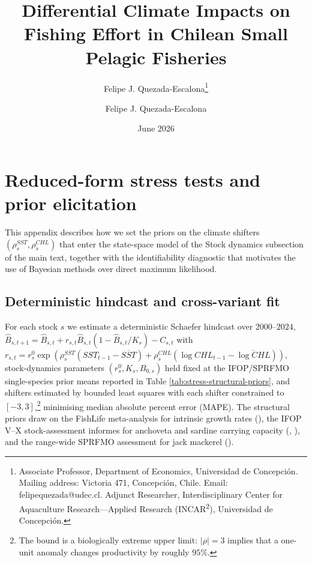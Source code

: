 \documentclass[
  11pt,
]{article}
\author{Felipe J. Quezada-Escalona\thanks{Associate Professor, Department of Economics, Universidad de Concepci\'on. Mailing address: Victoria 471, Concepci\'on, Chile. Email: felipequezada@udec.cl. Adjunct Researcher, Interdisciplinary Center for Aquaculture Research---Applied Research (INCAR\textsuperscript{2}), Universidad de Concepci\'on.}}
\affil{Universidad de Concepci\'on \vspace{-60pt}}
\title{Differential Climate Impacts on Fishing Effort in Chilean Small Pelagic Fisheries}
\subtitle{\begin{center}{\Large\textbf{Online Appendix}}\end{center}}
\author{Felipe J. Quezada-Escalona}
\date{June 2026}
\begin{document}
\maketitle

\doublespacing

\section{Reduced-form stress tests and prior elicitation}\label{appendix-stress}

This appendix describes how we set the priors on the climate shifters
\((\rho_s^{SST}, \rho_s^{CHL})\) that enter the state-space model of the
Stock dynamics subsection of the main text, together with the
identifiability diagnostic that motivates the use of Bayesian methods
over direct maximum likelihood.

\subsection{Deterministic hindcast and cross-variant fit}\label{sec:appendix-stress-spec}

For each stock \(s\) we estimate a deterministic Schaefer hindcast over
\(2000\)--\(2024\), \(\hat B_{s,t+1} = \hat B_{s,t} + r_{s,t}\hat B_{s,t}(1 - \hat B_{s,t}/K_s) - C_{s,t}\)
with \(r_{s,t} = r_s^{0} \exp(\rho_s^{SST}(SST_{t-1}-\overline{SST}) + \rho_s^{CHL}(\log CHL_{t-1}-\overline{\log CHL}))\),
stock-dynamics parameters \((r_s^{0}, K_s, B_{0,s})\) held fixed at the
IFOP/SPRFMO single-species prior means reported in Table \ref{tab:stress-structural-priors},
and shifters estimated by bounded least squares with each shifter
constrained to \([-3, 3]\),\footnote{The bound is a biologically extreme upper
  limit: \(|\rho|=3\) implies that a one-unit anomaly changes productivity
  by roughly \(95\%\).} minimising median absolute percent error (MAPE).
The structural priors draw on the FishLife meta-analysis for
intrinsic growth rates (), the IFOP V--X
stock-assessment informes for anchoveta and sardine carrying
capacity (, ), and the
range-wide SPRFMO assessment for jack mackerel ().
\end{document}

